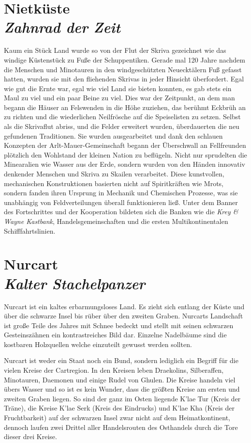 \section*{Nietküste \\ \textit{Zahnrad der Zeit}}

Kaum ein Stück Land wurde so von der Flut der Skriva gezeichnet wie das windige Küstenstück zu Fuße der Schuppentiken. Gerade mal 120 Jahre nachdem die Menschen und Minotauren in den windgeschützten Neuecktälern Fuß gefasst hatten, wurden sie mit den fliehenden Skrivas in jeder Hinsicht überfordert. Egal wie gut die Ernte war, egal wie viel Land sie bieten konnten, es gab stets ein Maul zu viel und ein paar Beine zu viel. Dies war der Zeitpunkt, an dem man begann die Häuser an Felswenden in die Höhe zuziehen, das berühmt Eckbrüh an zu richten und die wiederlichen Neilfrösche auf die Speiselisten zu setzen. Selbst als die Skrivaflut abriss, und die Felder erweitert wurden, überdauerten die neu gefundenen Traditionen. Sie wurden ausgearbeitet und dank den schlauen Konzepten der Arlt-Mauer-Gemeinschaft begann der Überschwall an Fellfreunden plötzlich den Wohlstand der kleinen Nation zu beflügeln. Nicht nur sprudelten die Minearalien wie Wasser aus der Erde, sondern wurden von den Händen innovativ denkender Menschen und Skriva zu Skailen verarbeitet. Diese kunstvollen, mechanischen Konstruktionen basierten nicht auf Spiritkräften wie Mrots, sondern fanden ihren Ursprung in Mechanik und Chemischen Prozesse, was sie unabhängig von Feldverteilungen überall funktionieren ließ. Unter dem Banner des Fortschrittes und der Kooperation bildeten sich die Banken wie die \textit{Krey \& Wayne Kastbank}, Handelsgemeinschaften und die ersten Multikontinentalen Schifffahrtslinien.

\section*{Nurcart \\ \textit{Kalter Stachelpanzer}}

Nurcart ist ein kaltes erbarmungsloses Land. Es zieht sich entlang der Küste und über die schwarze Insel bis rüber über den zweiten Graben. Nurcarts Landschaft ist große Teile des Jahres mit Schnee bedeckt und stellt mit seinen schwarzen Gesteinszähnen ein kontrastreiches Bild dar. Einzelne Nadelbäume sind die kostbaren Holzquellen welche einzuteilt gewusst werden sollten.

Nurcart ist weder ein Staat noch ein Bund, sondern lediglich ein Begriff für die vielen Kreise der Cartregion. In den Kreisen leben Draekolins, Silberaffen, Minotauren, Daemonen und einige Rudel von Ghulen. Die Kreise handeln viel übers Wasser und so ist es kein Wunder, dass die größten Kreise am ersten und zweiten Graben liegen. So sind der ganz im Osten liegende K'lae Tur (Kreis der Träne), die Kreise K'lae Serk (Kreis des Eindrucks) und K'lae Kha (Kreis der Fruchtbarkeit) auf der schwarzen Insel zwar nicht auf dem Heimatkontinent, dennoch laufen zwei Drittel aller Handelsrouten des Osthandels durch die Tore dieser drei Kreise.


